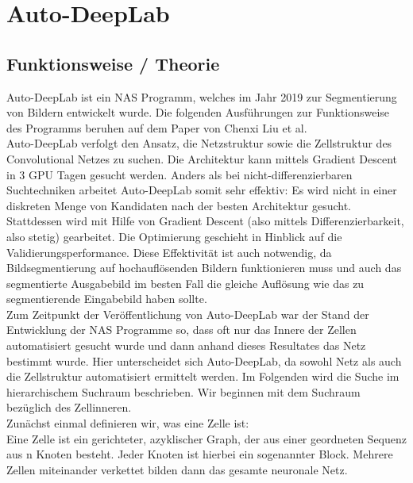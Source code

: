 \chapter{Auto-DeepLab}
\label{ch:autodeeplab}


\section{Funktionsweise / Theorie}

Auto-DeepLab ist ein NAS Programm, welches im Jahr 2019 zur Segmentierung von Bildern entwickelt wurde. Die folgenden Ausführungen zur Funktionsweise des Programms beruhen auf dem Paper \cite{autodeeplabPaper} von Chenxi Liu et al.\\
Auto-DeepLab verfolgt den Ansatz, die Netzstruktur sowie die Zellstruktur des Convolutional Netzes zu suchen. Die Architektur kann mittels Gradient Descent in 3 GPU Tagen gesucht werden. Anders als bei nicht-differenzierbaren Suchtechniken arbeitet Auto-DeepLab somit sehr effektiv: Es wird nicht in einer diskreten Menge von Kandidaten nach der besten Architektur gesucht. Stattdessen wird mit Hilfe von Gradient Descent (also mittels Differenzierbarkeit, also stetig) gearbeitet. Die Optimierung geschieht in Hinblick auf die Validierungsperformance. Diese Effektivität ist auch notwendig, da Bildsegmentierung auf hochauflösenden Bildern funktionieren muss und auch das segmentierte Ausgabebild im besten Fall die gleiche Auflösung wie das zu segmentierende Eingabebild haben sollte.\\
Zum Zeitpunkt der Veröffentlichung von Auto-DeepLab war der Stand der Entwicklung der NAS Programme so, dass oft nur das Innere der Zellen automatisiert gesucht wurde und dann anhand dieses Resultates das Netz bestimmt wurde. Hier unterscheidet sich Auto-DeepLab, da sowohl Netz als auch die Zellstruktur automatisiert ermittelt werden.
Im Folgenden wird die Suche im hierarchischem Suchraum beschrieben. Wir beginnen mit dem Suchraum bezüglich des Zellinneren.\\[0.3cm]
Zunächst einmal definieren wir, was eine Zelle ist:\\
Eine Zelle ist ein gerichteter, azyklischer Graph, der aus einer geordneten Sequenz aus n Knoten besteht. Jeder Knoten ist hierbei ein sogenannter Block. Mehrere Zellen miteinander verkettet bilden dann das gesamte neuronale Netz.\\
